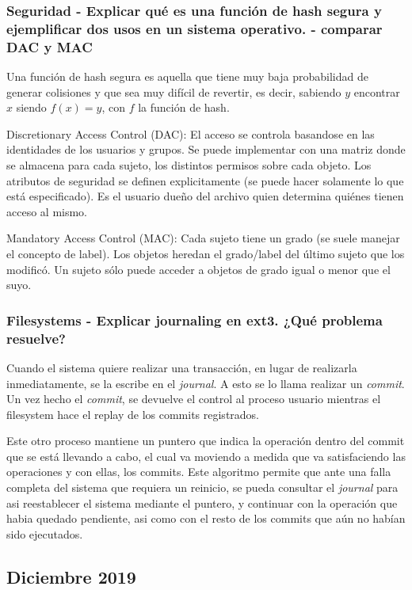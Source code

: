 \subsubsection{Seguridad - Explicar qué es una función de hash segura y ejemplificar dos usos en un sistema operativo. - comparar DAC y MAC}

Una función de hash segura es aquella que tiene muy baja probabilidad de generar colisiones y que sea muy difícil de revertir, es decir, sabiendo $y$ encontrar $x$ siendo $f(x) = y$, con $f$ la función de hash.

Discretionary Access Control (DAC): El acceso se controla basandose en las identidades de los usuarios y grupos. Se puede implementar con una matriz donde se almacena para cada sujeto, los distintos permisos sobre cada objeto. Los atributos de seguridad se definen explicitamente (se puede hacer solamente lo que está especificado). Es el usuario dueño del archivo quien determina quiénes tienen acceso al mismo.

Mandatory Access Control (MAC): Cada sujeto tiene un grado (se suele manejar el concepto de label). Los objetos heredan el grado/label del último sujeto que los modificó. Un sujeto sólo puede acceder a objetos de grado igual o menor que el suyo.

\subsubsection{Filesystems - Explicar journaling en ext3. ¿Qué problema resuelve?}

Cuando el sistema quiere realizar una transacción, en lugar de realizarla inmediatamente, se la escribe en el \textit{journal}. A esto se lo llama realizar un \textit{commit}. Un vez hecho el \textit{commit}, se devuelve el control al proceso usuario mientras el filesystem hace el replay de los commits registrados.

Este otro proceso mantiene un puntero que indica la operación dentro del commit que se está llevando a cabo, el cual va moviendo a medida que va satisfaciendo las operaciones y con ellas, los commits. Este algoritmo permite que ante una falla completa del sistema que requiera un reinicio, se pueda consultar el \textit{journal} para asi reestablecer el sistema mediante el puntero, y continuar con la operación que habia quedado pendiente, asi como con el resto de los commits que aún no habían sido ejecutados.

\subsection{Diciembre 2019}
